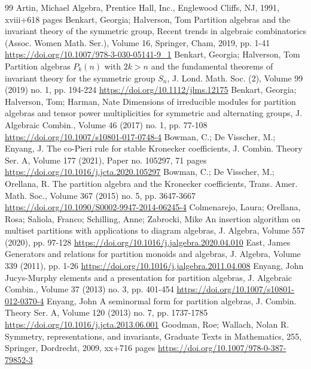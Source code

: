 \begin{thebibliography}{99}
 Artin, Michael Algebra, Prentice Hall, Inc., Englewood Cliffs, NJ, 1991, xviii+618 pages
 Benkart, Georgia; Halverson, Tom Partition algebras and the invariant theory of the symmetric group, Recent trends in algebraic combinatorics (Assoc. Women Math. Ser.), Volume 16, Springer, Cham, 2019, pp. 1-41 \url{https://doi.org/10.1007/978-3-030-05141-9_1}
 Benkart, Georgia; Halverson, Tom Partition algebras ${P}_k(n)$ with $2k>n$ and the fundamental theorems of invariant theory for the symmetric group ${S}_n$, J. Lond. Math. Soc. (2), Volume 99 (2019) no. 1, pp. 194-224 \url{https://doi.org/10.1112/jlms.12175}
 Benkart, Georgia; Halverson, Tom; Harman, Nate Dimensions of irreducible modules for partition algebras and tensor power multiplicities for symmetric and alternating groups, J. Algebraic Combin., Volume 46 (2017) no. 1, pp. 77-108 \url{https://doi.org/10.1007/s10801-017-0748-4}
 Bowman, C.; De Visscher, M.; Enyang, J. The co-Pieri rule for stable Kronecker coefficients, J. Combin. Theory Ser. A, Volume 177 (2021), Paper no. 105297, 71 pages \url{https://doi.org/10.1016/j.jcta.2020.105297}
 Bowman, C.; De Visscher, M.; Orellana, R. The partition algebra and the Kronecker coefficients, Trans. Amer. Math. Soc., Volume 367 (2015) no. 5, pp. 3647-3667 \url{https://doi.org/10.1090/S0002-9947-2014-06245-4}
 Colmenarejo, Laura; Orellana, Rosa; Saliola, Franco; Schilling, Anne; Zabrocki, Mike An insertion algorithm on multiset partitions with applications to diagram algebras, J. Algebra, Volume 557 (2020), pp. 97-128 \url{https://doi.org/10.1016/j.jalgebra.2020.04.010}
 East, James Generators and relations for partition monoids and algebras, J. Algebra, Volume 339 (2011), pp. 1-26 \url{https://doi.org/10.1016/j.jalgebra.2011.04.008}
 Enyang, John Jucys-Murphy elements and a presentation for partition algebras, J. Algebraic Combin., Volume 37 (2013) no. 3, pp. 401-454 \url{https://doi.org/10.1007/s10801-012-0370-4}
 Enyang, John A seminormal form for partition algebras, J. Combin. Theory Ser. A, Volume 120 (2013) no. 7, pp. 1737-1785 \url{https://doi.org/10.1016/j.jcta.2013.06.001}
 Goodman, Roe; Wallach, Nolan R. Symmetry, representations, and invariants, Graduate Texts in Mathematics, 255, Springer, Dordrecht, 2009, xx+716 pages \url{https://doi.org/10.1007/978-0-387-79852-3}

\end{thebibliography}
